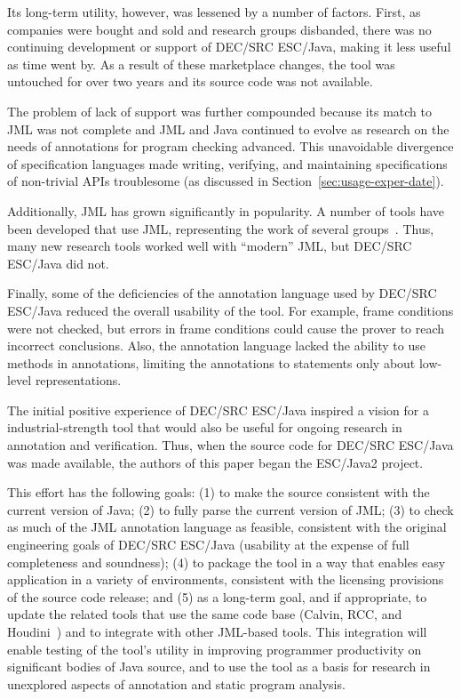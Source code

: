 \documentclass{sig-alternate}
\begin{document}
Its long-term utility, however, was lessened by a number of factors.
First, as companies were bought and sold and research groups
disbanded, there was no continuing development or support of DEC/SRC
ESC/Java, making it less useful as time went by.  As a result of these
marketplace changes, the tool was untouched for over two years and its
source code was not available.  

The problem of lack of support was further compounded because its
match to JML was not complete and JML and Java continued to evolve as
research on the needs of annotations for program checking advanced.
This unavoidable divergence of specification languages made writing,
verifying, and maintaining specifications of non-trivial APIs
troublesome (as discussed in Section~\ref{sec:usage-exper-date}).

Additionally, JML has grown significantly in popularity.  A number of
tools have been developed that use JML, representing the work of several
groups~\cite{Burdy-etal03jmlpapers,Bogor03,NimmerErnst01Leavens-etal00}.
Thus, many new research tools worked well with ``modern'' JML, but
DEC/SRC ESC/Java did not.

Finally, some of the deficiencies of the annotation language used by
DEC/SRC ESC/Java reduced the overall usability of the tool.  For
example, frame conditions were not checked, but errors in frame
conditions could cause the prover to reach incorrect conclusions.
Also, the annotation language lacked the ability to use methods in
annotations, limiting the annotations to statements only about
low-level representations.

The initial positive experience of DEC/SRC ESC/Java inspired a vision
for a industrial-strength tool that would also be useful for ongoing
research in annotation and verification.  Thus, when the source code
for DEC/SRC ESC/Java was made available, the authors of this paper
began the ESC/Java2 project.  

This effort has the following goals:
(1) to make the source consistent with the current version of Java;
(2) to fully parse the current version of JML;
(3) to check as much of the JML annotation language as feasible,
consistent with the original engineering goals of DEC/SRC ESC/Java
(usability at the expense of full completeness and soundness); 
(4) to package the tool in a way that enables easy application in a
variety of environments, consistent with the licensing provisions of
the source code release;
and
(5) as a long-term goal, and if appropriate, to update the related
tools that use the same code base (Calvin, RCC, and Houdini~\cite{flanagan01houdini}) and to
integrate with other JML-based tools.  This integration will
enable testing of the tool's utility in improving programmer
productivity on significant bodies of Java source,
and to use the tool as a basis for research in unexplored aspects of
annotation and static program analysis.
  
\end{document}
